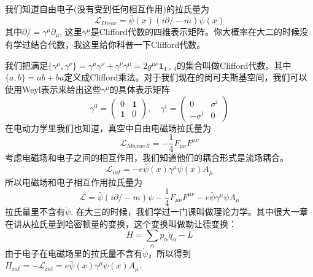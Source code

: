 \documentclass[a4paper]{article}
\begin{document}
    我们知道自由电子(没有受到任何相互作用)的拉氏量为
    \begin{equation}
        \mathcal{L}_{Dirac}=\bar{\psi}(x)(i\partial \!\!\!/-m)\psi(x)
    \end{equation}
    其中$\partial \!\!\!/=\gamma^\mu\partial_\mu$, 这里$\gamma^\mu$是Clifford代数的四维表示矩阵。你大概率在大二的时候没有学过结合代数，我这里给你科普一下Clifford代数。

    我们把满足$\{\gamma^\mu,\gamma^\nu\}=\gamma^\mu\gamma^\nu+\gamma^\nu\gamma^\mu=2g^{\mu\nu}\mathbf{1}_{4\times 4}$的集合叫做Clifford代数。其中$\{a,b\}=ab+ba$定义成Clifford乘法。对于我们现在的闵可夫斯基空间，我们可以使用Weyl表示来给出这些$\gamma^\mu$的具体表示矩阵
    \begin{equation}
        \gamma^0=\begin{pmatrix}
            0&\mathbf{1}\\
            \mathbf{1}&0
        \end{pmatrix},\quad \gamma^i=\begin{pmatrix}
            0&\sigma^i\\
            -\sigma^i&0
        \end{pmatrix}
    \end{equation}
    在电动力学里我们也知道，真空中自由电磁场拉氏量为
    \begin{equation}
        \mathcal{L}_{Maxwell}=-\frac{1}{4}F_{\mu\nu}F^{\mu\nu}
    \end{equation}
    考虑电磁场和电子之间的相互作用，我们知道他们的耦合形式是流场耦合。
    \begin{equation}
        \mathcal{L}_{int}=-e\bar\psi(x)\gamma^\mu\psi(x)A_\mu
    \end{equation}
    所以电磁场和电子相互作用拉氏量为
    \begin{equation}
        \mathcal{L}=\bar\psi(i\partial \!\!\!/-m)\psi-\frac{1}{4}F_{\mu\nu}F^{\mu\nu}-e\bar\psi\gamma^\mu\psi A_\mu
    \end{equation}
    拉氏量里不含有$\dot{\psi}$. 在大三的时候，我们学过一门课叫做理论力学。其中很大一章在讲从拉氏量到哈密顿量的变换，这个变换叫做勒让德变换：
    \begin{equation}
        H=\sum_\alpha p_\alpha\dot{q}_\alpha-L
    \end{equation}
    由于电子在电磁场里的拉氏量不含有$\dot{\psi}$，所以得到$H_{int}=-\mathcal{L}_{int}=e\bar\psi(x)\gamma^\mu\psi(x)A_\mu$.
\end{document}
